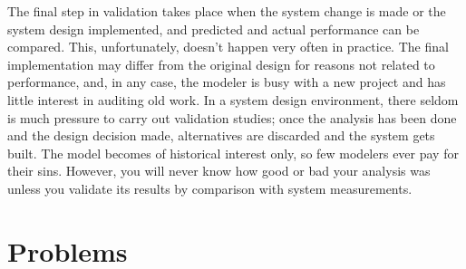 The final step in validation takes place when the system change is made or the
system design implemented, and predicted and actual performance can be
compared. This, unfortunately, doesn't happen very often in practice. The
final implementation may differ from the original design for reasons not
related to performance, and, in any case, the modeler is busy with a new
project and has little interest in auditing old work. In a system design
\noindent environment, there seldom is much pressure to carry out validation studies;
once the analysis has been done and the design decision made, alternatives are
discarded and the system gets built. The model becomes of historical interest
only, so few modelers ever pay for their sins. However, you will never know
how good or bad your analysis was unless you validate its results by
comparison with system measurements.

\section{Problems}
\label{sec:model-development-problems}

